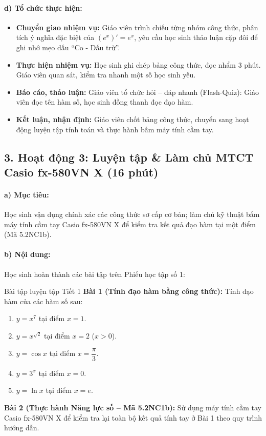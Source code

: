 \documentclass[12pt, a4paper]{article}
\begin{document}
\paragraph{d) Tổ chức thực hiện:}
\begin{itemize}[leftmargin=0.8cm]
    \item \textbf{Chuyển giao nhiệm vụ:} Giáo viên trình chiếu từng nhóm công thức, phân tích ý nghĩa đặc biệt của $(e^x)' = e^x$, yêu cầu học sinh thảo luận cặp đôi để ghi nhớ mẹo dấu ``Co - Dấu trừ''.
    \item \textbf{Thực hiện nhiệm vụ:} Học sinh ghi chép bảng công thức, đọc nhẩm 3 phút. Giáo viên quan sát, kiểm tra nhanh một số học sinh yếu.
    \item \textbf{Báo cáo, thảo luận:} Giáo viên tổ chức hỏi -- đáp nhanh (Flash-Quiz): Giáo viên đọc tên hàm số, học sinh đồng thanh đọc đạo hàm.
    \item \textbf{Kết luận, nhận định:} Giáo viên chốt bảng công thức, chuyển sang hoạt động luyện tập tính toán và thực hành bấm máy tính cầm tay.
\end{itemize}

\subsection*{3. Hoạt động 3: Luyện tập & Làm chủ MTCT Casio fx-580VN X (16 phút)}

\paragraph{a) Mục tiêu:} Học sinh vận dụng chính xác các công thức sơ cấp cơ bản; làm chủ kỹ thuật bấm máy tính cầm tay Casio fx-580VN X để kiểm tra kết quả đạo hàm tại một điểm (Mã 5.2NC1b).

\paragraph{b) Nội dung:} Học sinh hoàn thành các bài tập trên Phiếu học tập số 1:

\begin{pedabox}{Bài tập luyện tập Tiết 1}
\textbf{Bài 1 (Tính đạo hàm bằng công thức):} Tính đạo hàm của các hàm số sau:
\begin{enumerate}[leftmargin=0.6cm]
    \item[a)] $y = x^7$ tại điểm $x = 1$.
    \item[b)] $y = x^{\sqrt{2}}$ tại điểm $x = 2$ ($x > 0$).
    \item[c)] $y = \cos x$ tại điểm $x = \dfrac{\pi}{3}$.
    \item[d)] $y = 3^x$ tại điểm $x = 0$.
    \item[e)] $y = \ln x$ tại điểm $x = e$.
\end{enumerate}

\textbf{Bài 2 (Thực hành Năng lực số -- Mã 5.2NC1b):} Sử dụng máy tính cầm tay Casio fx-580VN X để kiểm tra lại toàn bộ kết quả tính tay ở Bài 1 theo quy trình hướng dẫn.
\end{pedabox}
\end{document}
